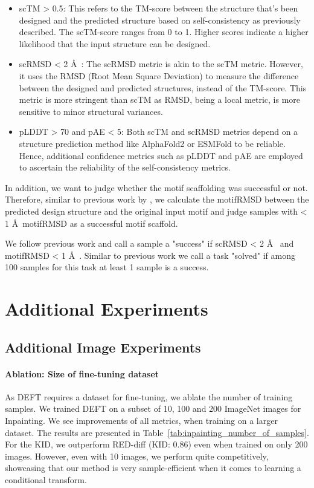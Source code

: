 \begin{itemize}

    \item scTM > 0.5: This refers to the TM-score between the structure that's been designed and the predicted structure based on self-consistency as previously described. The scTM-score ranges from 0 to 1. Higher scores indicate a higher likelihood that the input structure can be designed. 

    \item scRMSD < 2 \AA~: The scRMSD metric is akin to the scTM metric. However, it uses the RMSD (Root Mean Square Deviation) to measure the difference between the designed and predicted structures, instead of the TM-score. This metric is more stringent than scTM as RMSD, being a local metric, is more sensitive to minor structural variances.

    \item pLDDT > 70 and pAE < 5: Both scTM and scRMSD metrics depend on a structure prediction method like AlphaFold2 or ESMFold to be reliable. Hence, additional confidence metrics such as pLDDT and pAE are employed to ascertain the reliability of the self-consistency metrics.
\end{itemize}

In addition, we want to judge whether the motif scaffolding was successful or not. Therefore, similar to previous work by \textcite{watson2023novo}, we calculate the motifRMSD between the predicted design structure and the original input motif and judge samples with < 1 \AA~motifRMSD as a successful motif scaffold.

We follow previous work and call a sample a "success" if scRMSD < 2 \AA~ and motifRMSD < 1 \AA~. Similar to previous work we call a task "solved" if among 100 samples for this task at least 1 sample is a success.

\section{Additional Experiments}

\subsection{Additional Image Experiments}

\paragraph{Ablation: Size of fine-tuning dataset}
As DEFT requires a dataset for fine-tuning, we ablate the number of training samples. We trained DEFT on a subset of 10, 100 and 200 ImageNet images for Inpainting. We see improvements of all metrics, when training on a larger dataset. The results are presented in Table~\ref{tab:inpainting_number_of_samples}. For the KID, we outperform RED-diff (KID: 0.86) even when trained on only 200 images. However, even with 10 images, we perform quite competitively, showcasing that our method is very sample-efficient when it comes to learning a conditional transform.

